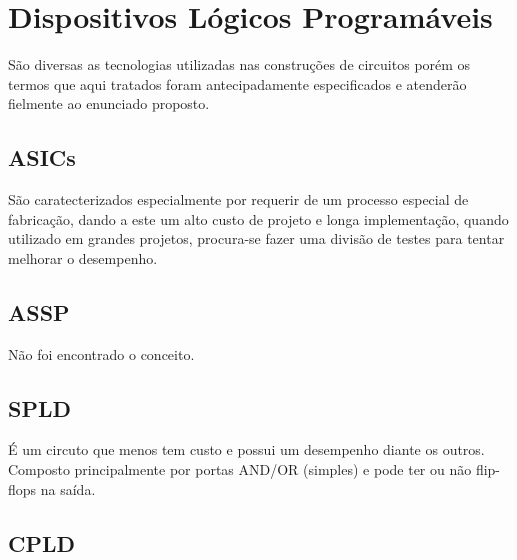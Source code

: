 \section{\esp Dispositivos Lógicos Programáveis}

São diversas as tecnologias utilizadas nas construções de circuitos porém os termos que aqui tratados foram antecipadamente especificados e atenderão fielmente ao enunciado proposto.


\subsection{\esp ASICs}

São caratecterizados especialmente por requerir de um processo especial de fabricação, dando a este um alto custo de projeto e longa implementação, quando utilizado em grandes projetos, procura-se fazer uma divisão de testes para tentar melhorar o desempenho.

\subsection{\esp ASSP}

Não foi encontrado o conceito.

\subsection{\esp SPLD}

É um circuto que menos tem custo e possui um desempenho diante os outros. Composto principalmente por portas AND/OR (simples) e pode ter ou não flip-flops na saída.

\subsection{\esp CPLD}

